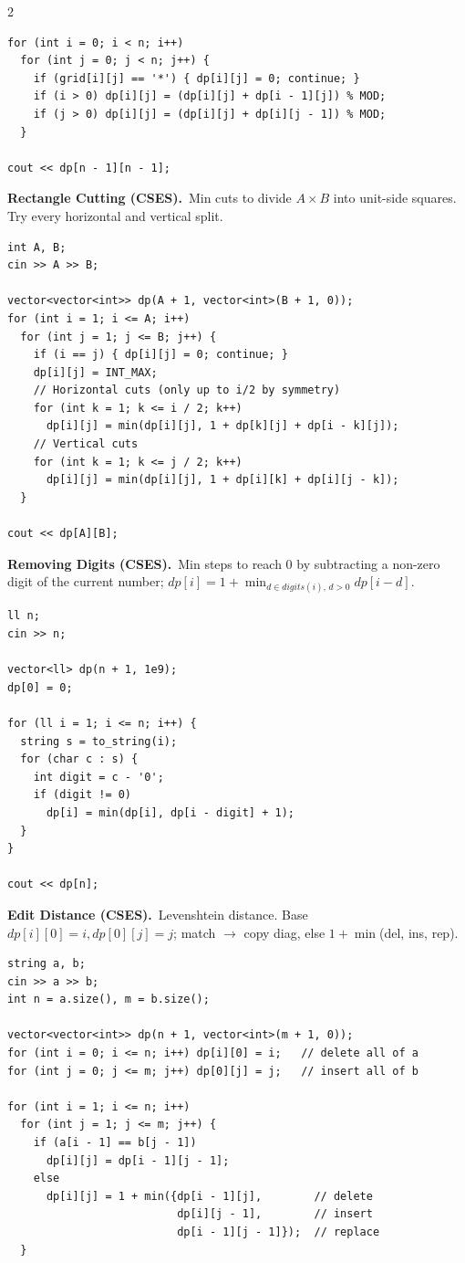 \documentclass[10pt,letterpaper]{extarticle}
\newcommand{\prob}[2]{\par\addvspace{10pt}\noindent\label{prob:#1}\textbf{\normalsize #1.}\ {\small #2}\par\nopagebreak}
\begin{document}
\begin{multicols*}{2}
\begin{lstlisting}[style=cppt]
for (int i = 0; i < n; i++)
  for (int j = 0; j < n; j++) {
    if (grid[i][j] == '*') { dp[i][j] = 0; continue; }
    if (i > 0) dp[i][j] = (dp[i][j] + dp[i - 1][j]) % MOD;
    if (j > 0) dp[i][j] = (dp[i][j] + dp[i][j - 1]) % MOD;
  }

cout << dp[n - 1][n - 1];
\end{lstlisting}

\prob{Rectangle Cutting (CSES)}{Min cuts to divide $A\times B$ into unit-side squares. Try every horizontal and vertical split.}
\begin{lstlisting}[style=cppt]
int A, B;
cin >> A >> B;

vector<vector<int>> dp(A + 1, vector<int>(B + 1, 0));
for (int i = 1; i <= A; i++)
  for (int j = 1; j <= B; j++) {
    if (i == j) { dp[i][j] = 0; continue; }
    dp[i][j] = INT_MAX;
    // Horizontal cuts (only up to i/2 by symmetry)
    for (int k = 1; k <= i / 2; k++)
      dp[i][j] = min(dp[i][j], 1 + dp[k][j] + dp[i - k][j]);
    // Vertical cuts
    for (int k = 1; k <= j / 2; k++)
      dp[i][j] = min(dp[i][j], 1 + dp[i][k] + dp[i][j - k]);
  }

cout << dp[A][B];
\end{lstlisting}

\prob{Removing Digits (CSES)}{Min steps to reach 0 by subtracting a non-zero digit of the current number; $dp[i]=1+\min_{d\in digits(i),\,d>0}dp[i-d]$.}
\begin{lstlisting}[style=cppt]
ll n;
cin >> n;

vector<ll> dp(n + 1, 1e9);
dp[0] = 0;

for (ll i = 1; i <= n; i++) {
  string s = to_string(i);
  for (char c : s) {
    int digit = c - '0';
    if (digit != 0)
      dp[i] = min(dp[i], dp[i - digit] + 1);
  }
}

cout << dp[n];
\end{lstlisting}

\prob{Edit Distance (CSES)}{Levenshtein distance. Base $dp[i][0]=i, dp[0][j]=j$; match $\to$ copy diag, else $1+\min$(del, ins, rep).}
\begin{lstlisting}[style=cppt]
string a, b;
cin >> a >> b;
int n = a.size(), m = b.size();

vector<vector<int>> dp(n + 1, vector<int>(m + 1, 0));
for (int i = 0; i <= n; i++) dp[i][0] = i;   // delete all of a
for (int j = 0; j <= m; j++) dp[0][j] = j;   // insert all of b

for (int i = 1; i <= n; i++)
  for (int j = 1; j <= m; j++) {
    if (a[i - 1] == b[j - 1])
      dp[i][j] = dp[i - 1][j - 1];
    else
      dp[i][j] = 1 + min({dp[i - 1][j],        // delete
                          dp[i][j - 1],        // insert
                          dp[i - 1][j - 1]});  // replace
  }


\end{lstlisting}
\end{multicols*}
\end{document}
